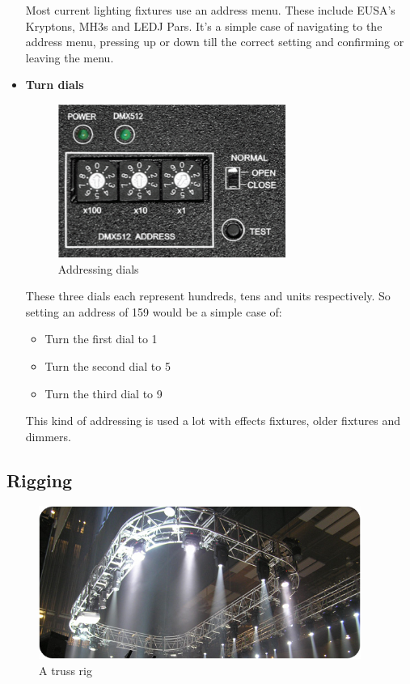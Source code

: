 \documentclass[14pt]{article} %
\begin{document}
\begin{itemize}
Most current lighting fixtures use an address menu. These include EUSA’s Kryptons, MH3s and LEDJ Pars. It’s a simple case of navigating to the address menu, pressing up or down till the correct setting and confirming or leaving the menu.

\item \textbf{Turn dials}

\begin{figure}[h]
\begin{center}

\includegraphics[height=5cm]{dial.png}
\caption{Addressing dials}
\label{fig:dial}

\end{center}
\end{figure}

These three dials each represent hundreds, tens and units respectively. So setting an address of 159 would be a simple case of:
\begin{itemize}
\item	Turn the first dial to 1
\item	Turn the second dial to 5
\item	Turn the third dial to 9
\end{itemize}
This kind of addressing is used a lot with effects fixtures, older fixtures and dimmers.


\end{itemize}

\subsection{Rigging}

\begin{figure}[h]
\begin{center}

\includegraphics[height=5cm]{rigging.jpg}
\caption{A truss rig}
\label{fig:rig}

\end{center}
\end{figure}
\end{document}
